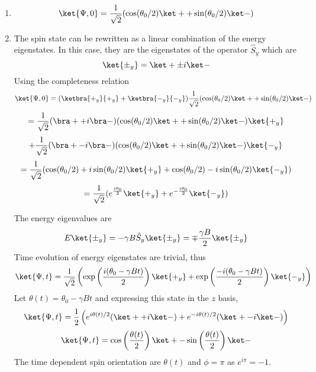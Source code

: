 \begin{sol}
\begin{enumerate}[label=\textbf{(\alph*)}]
    \item
    $$\ket{\Psi,0}=\frac{1}{\sqrt{2}}(\cos(\theta_0/2)\ket++\sin(\theta_0/2)\ket-)$$
    \item
    The spin state can be rewritten as a linear combination of the energy eigenstates. In this case, they are the eigenstates of the operator $\hat S_y$ which are 
    $$\ket{\pm_y}=\ket+\pm i\ket-$$
    Using the completeness relation
    $$\ket{\Psi,0}=(\ketbra{+_y}{+_y}+\ketbra{-_y}{-_y})\frac{1}{\sqrt{2}}(\cos(\theta_0/2)\ket++\sin(\theta_0/2)\ket-)$$
    $$=\frac{1}{\sqrt{2}}(\bra++i\bra-)(\cos(\theta_0/2)\ket++\sin(\theta_0/2)\ket-)\ket{+_y}$$
    $$+\frac{1}{\sqrt{2}}(\bra+-i\bra-)(\cos(\theta_0/2)\ket++\sin(\theta_0/2)\ket-)\ket{-_y}$$
    $$=\frac{1}{\sqrt{2}}(\cos(\theta_0/2)+i\sin(\theta_0/2)\ket{+_y}+\cos(\theta_0/2)-i\sin(\theta_0/2)\ket{-_y})$$
    $$=\frac{1}{\sqrt{2}}(e^{\frac{i\theta_0}{2}}\ket{+_y}+e^{-\frac{i\theta_0}{2}}\ket{-_y})$$
    
    The energy eigenvalues are 
    $$E\ket{\pm_y}=-\gamma B\hat S_y\ket{\pm_y}=\mp\frac{\gamma B}{2}\ket{\pm_y}$$
    Time evolution of energy eigenstates are trivial, thus
    $$\ket{\Psi,t}=\frac{1}{\sqrt{2}}\left(\exp\left(\frac{i(\theta_0-\gamma Bt)}{2}\right)\ket{+_y}+\exp\left(\frac{-i(\theta_0-\gamma Bt)}{2}\right)\ket{-_y}\right)$$
    Let $\theta(t)=\theta_0-\gamma Bt$ and expressing this state in the $z$ basis,
    $$\ket{\Psi,t}=\frac{1}{2}\left(e^{i\theta(t)/2}(\ket++i\ket-)+e^{-i\theta(t)/2}(\ket+-i\ket-)\right)$$
    $$\ket{\Psi,t}=\cos\left(\frac{\theta(t)}{2}\right)\ket+-\sin\left(\frac{\theta(t)}{2}\right)\ket-$$
    The time dependent spin orientation are $\theta(t)$ and $\phi=\pi$ as $e^{i\pi}=-1$.
\end{enumerate}
\end{sol}